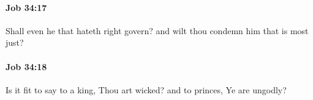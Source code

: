 		\paragraph{Job 34:17} %
			\label{JOB-34-17}

			Shall even he that hateth right govern? and wilt thou condemn him that is most just?


		\paragraph{Job 34:18} %
			\label{JOB-34-18}

			Is it fit to say to a king, Thou art wicked? and to princes, Ye are ungodly?


